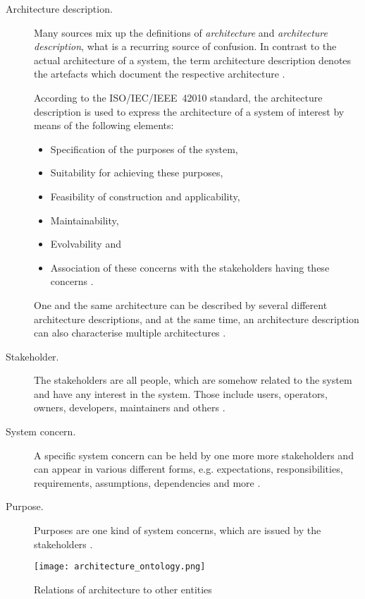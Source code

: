 \begin{description}
\item [Architecture description.]
	Many sources mix up the definitions of \emph{architecture} and \emph{architecture description}, what is a recurring source of confusion. In contrast to the actual architecture of a system, the term architecture description denotes the artefacts which document the respective architecture \cite{ISO_42010}.

	According to the \mbox{ISO/IEC/IEEE 42010} standard, the architecture description is used to express the architecture of a system of interest by means of the following elements:
	\begin{itemize}
	\item Specification of the purposes of the system,
	\item Suitability for achieving these purposes,
	\item Feasibility of construction and applicability,
	\item Maintainability,
	\item Evolvability and
	\item Association of these concerns with the stakeholders having these concerns \cite{ISO_42010}.
	\end{itemize}
	One and the same architecture can be described by several different architecture descriptions, and at the same time, an architecture description can also characterise multiple architectures \cite{ISO_42010}.

\item [Stakeholder.]
	The stakeholders are all people, which are somehow related to the system and have any interest in the system. Those include users, operators, owners, developers, maintainers and others \cite{ISO_42010}.

\item [System concern.]
	A specific system concern can be held by one more more stakeholders and can appear in various different forms, e.g. expectations, responsibilities, requirements, assumptions, dependencies and more \cite{ISO_42010}. 

\item [Purpose.]
	Purposes are one kind of system concerns, which are issued by the stakeholders \cite{ISO_42010}.
\end{description}

\begin{figure}[!htbp]
\centering
\texttt{[image: architecture\_ontology.png]}
\caption{Relations of architecture to other entities \cite{ISO_42010}}
\label{fig:architecture_ontology}
\end{figure}










